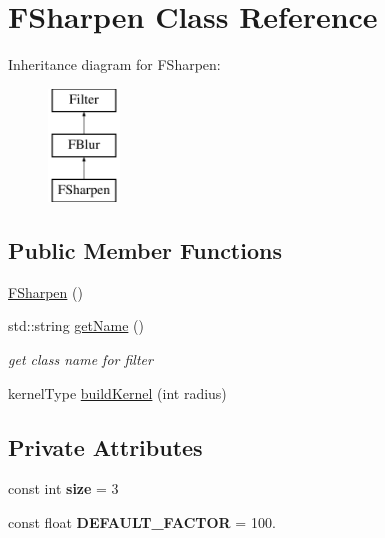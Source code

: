 \hypertarget{classFSharpen}{}\section{F\+Sharpen Class Reference}
\label{classFSharpen}
Inheritance diagram for F\+Sharpen\+:\begin{figure}[H]
\begin{center}
\leavevmode
\includegraphics[height=3.000000cm]{classFSharpen}
\end{center}
\end{figure}
\subsection*{Public Member Functions}
\begin{DoxyCompactItemize}
\item 
\hyperlink{classFSharpen_adc68195ce6237058f9846439e2c9af49}{F\+Sharpen} ()
\item 
std\+::string \hyperlink{classFSharpen_ae322ad5626a003ae1e1c6e385dd43ca8}{get\+Name} ()\hypertarget{classFSharpen_ae322ad5626a003ae1e1c6e385dd43ca8}{}\label{classFSharpen_ae322ad5626a003ae1e1c6e385dd43ca8}

\begin{DoxyCompactList}\small\item\em get class name for filter \end{DoxyCompactList}\item 
kernel\+Type \hyperlink{classFSharpen_afafd2b34e58d2fb682150be2159d7986}{build\+Kernel} (int radius)
\end{DoxyCompactItemize}
\subsection*{Private Attributes}
\begin{DoxyCompactItemize}
\item 
const int {\bfseries size} = 3\hypertarget{classFSharpen_a4e16215737e297abc7b2ee7a7c5bde17}{}\label{classFSharpen_a4e16215737e297abc7b2ee7a7c5bde17}

\item 
const float {\bfseries D\+E\+F\+A\+U\+L\+T\+\_\+\+F\+A\+C\+T\+OR} = 100.\hypertarget{classFSharpen_a8db2549f63e2c83a877b8db5f886e7c1}{}\label{classFSharpen_a8db2549f63e2c83a877b8db5f886e7c1}

\end{DoxyCompactItemize}


